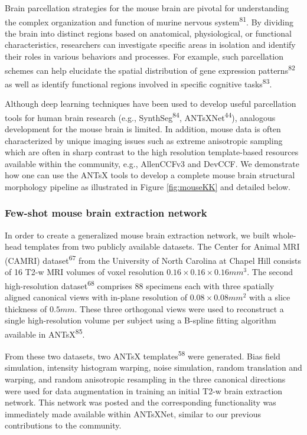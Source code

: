 \documentclass[
  12pt,
]{article}
\begin{document}
Brain parcellation strategies for the mouse brain are pivotal for
understanding the complex organization and function of murine nervous
system\textsuperscript{81}. By dividing the brain into distinct regions
based on anatomical, physiological, or functional characteristics,
researchers can investigate specific areas in isolation and identify
their roles in various behaviors and processes. For example, such
parcellation schemes can help elucidate the spatial distribution of gene
expression patterns\textsuperscript{82} as well as identify functional
regions involved in specific cognitive tasks\textsuperscript{83}.

Although deep learning techniques have been used to develop useful
parcellation tools for human brain research (e.g.,
SynthSeg\textsuperscript{84}, ANTsXNet\textsuperscript{44}), analogous
development for the mouse brain is limited. In addition, mouse data is
often characterized by unique imaging issues such as extreme anisotropic
sampling which are often in sharp contrast to the high resolution
template-based resources available within the community, e.g.,
AllenCCFv3 and DevCCF. We demonstrate how one can use the ANTsX tools to
develop a complete mouse brain structural morphology pipeline as
illustrated in Figure \ref{fig:mouseKK} and detailed below.

\subsubsection{Few-shot mouse brain extraction
network}\label{few-shot-mouse-brain-extraction-network}

In order to create a generalized mouse brain extraction network, we
built whole-head templates from two publicly available datasets. The
Center for Animal MRI (CAMRI) dataset\textsuperscript{67} from the
University of North Carolina at Chapel Hill consists of 16 T2-w MRI
volumes of voxel resolution \(0.16 \times 0.16 \times 0.16 mm^3\). The
second high-resolution dataset\textsuperscript{68} comprises 88
specimens each with three spatially aligned canonical views with
in-plane resolution of \(0.08 \times 0.08 mm^2\) with a slice thickness
of \(0.5 mm\). These three orthogonal views were used to reconstruct a
single high-resolution volume per subject using a B-spline fitting
algorithm available in ANTsX\textsuperscript{85}.

From these two datasets, two ANTsX templates\textsuperscript{58} were
generated. Bias field simulation, intensity histogram warping, noise
simulation, random translation and warping, and random anisotropic
resampling in the three canonical directions were used for data
augmentation in training an initial T2-w brain extraction network. This
network was posted and the corresponding functionality was immediately
made available within ANTsXNet, similar to our previous contributions to
the community.
\end{document}
